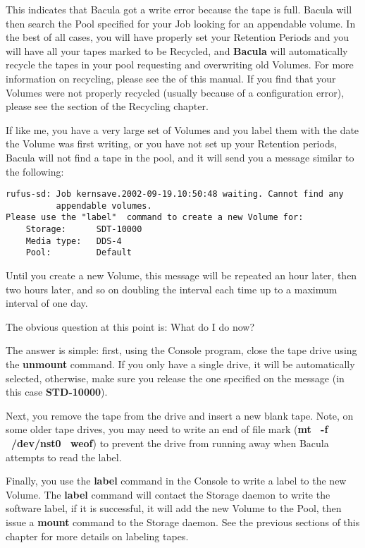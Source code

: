 This indicates that Bacula got a write error because the tape is full. Bacula
will then search the Pool specified for your Job looking for an appendable
volume. In the best of all cases, you will have properly set your Retention
Periods and you will have all your tapes marked to be Recycled, and {\bf
Bacula} will automatically recycle the tapes in your pool requesting and
overwriting old Volumes. For more information on recycling, please see the 
 of this manual. If you
find that your Volumes were not properly recycled (usually because of a
configuration error), please see the 
 section of
the Recycling chapter. 

If like me, you have a very large set of Volumes and you label them with the
date the Volume was first writing, or you have not set up your Retention
periods, Bacula will not find a tape in the pool, and it will send you a
message similar to the following: 

\footnotesize
\begin{verbatim}
rufus-sd: Job kernsave.2002-09-19.10:50:48 waiting. Cannot find any
          appendable volumes.
Please use the "label"  command to create a new Volume for:
    Storage:      SDT-10000
    Media type:   DDS-4
    Pool:         Default
\end{verbatim}
\normalsize

Until you create a new Volume, this message will be repeated an hour later,
then two hours later, and so on doubling the interval each time up to a
maximum interval of one day. 

The obvious question at this point is: What do I do now? 

The answer is simple: first, using the Console program, close the tape drive
using the {\bf unmount} command. If you only have a single drive, it will be
automatically selected, otherwise, make sure you release the one specified on
the message (in this case {\bf STD-10000}). 

Next, you remove the tape from the drive and insert a new blank tape. Note, on
some older tape drives, you may need to write an end of file mark ({\bf mt \
-f \ /dev/nst0 \ weof}) to prevent the drive from running away when Bacula
attempts to read the label. 

Finally, you use the {\bf label} command in the Console to write a label to
the new Volume. The {\bf label} command will contact the Storage daemon to
write the software label, if it is successful, it will add the new Volume to
the Pool, then issue a {\bf mount} command to the Storage daemon. See the
previous sections of this chapter for more details on labeling tapes. 

